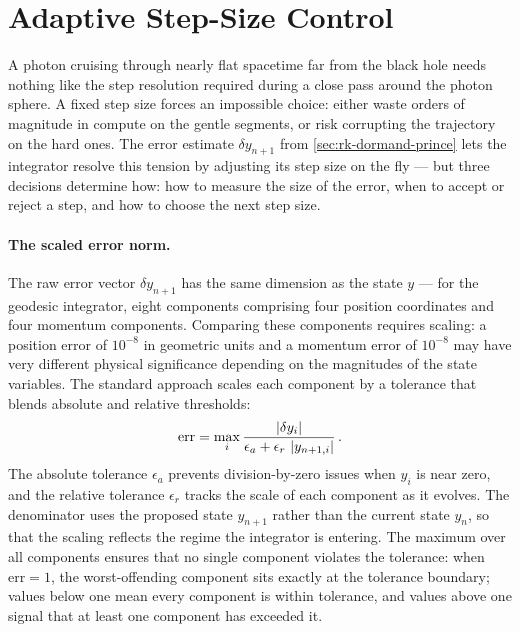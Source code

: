 \section{Adaptive Step-Size Control}
\label{sec:rk-adaptive}

A photon cruising through nearly flat spacetime far from the black hole
needs nothing like the step resolution required during a close pass
around the photon sphere.  A fixed step size forces an impossible
choice: either waste orders of magnitude in compute on the gentle
segments, or risk corrupting the trajectory on the hard ones.  The
error estimate $\delta y_{n+1}$ from \cref{sec:rk-dormand-prince}
lets the integrator resolve this tension by adjusting its step size on
the fly --- but three decisions determine how: how to measure the size
of the error, when to accept or reject a step, and how to choose the
next step size.

\paragraph{The scaled error norm.}

The raw error vector $\delta y_{n+1}$ has the same dimension as the
state $y$ --- for the geodesic integrator, eight components comprising
four position coordinates and four momentum components.  Comparing
these components requires scaling: a position error of $10^{-8}$ in
geometric units and a momentum error of $10^{-8}$ may have very
different physical significance depending on the magnitudes of the
state variables.  The standard approach scales each component by a
tolerance that blends absolute and relative thresholds:
%
\begin{equation}
  \mathrm{err} = \max_{i} \frac{\left\lvert \delta y_i \right\rvert}
    {\epsilon_a + \epsilon_r\,\left\lvert y_{n+1,i} \right\rvert} \,.
  \label{eq:rk-error-norm}
\end{equation}
%
The absolute tolerance $\epsilon_a$ prevents division-by-zero issues
when $y_i$ is near zero, and the relative tolerance $\epsilon_r$ tracks
the scale of each component as it evolves.  The denominator uses the
proposed state $y_{n+1}$ rather than the current state $y_n$, so that
the scaling reflects the regime the integrator is entering.  The
maximum over all components ensures that no single component violates
the tolerance: when $\mathrm{err} = 1$, the worst-offending component
sits exactly at the tolerance boundary; values below one mean every
component is within tolerance, and values above one signal that at
least one component has exceeded it.

